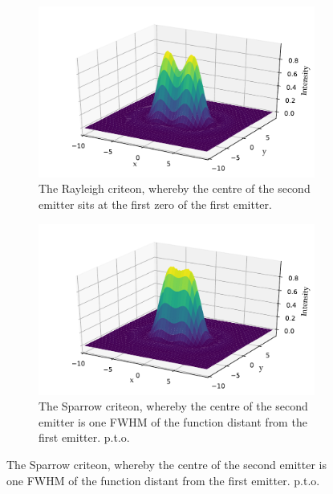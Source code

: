 \begin{figure}
    \centering
    \begin{subfigure}[b]{\textwidth}
        \centering
        \includegraphics{+airy_rayleigh}
        \caption{The Rayleigh criteon, whereby the centre of the second emitter sits at the first zero of the first emitter.}\label{fig:airy_rayleigh}
    \end{subfigure}
    \begin{subfigure}[b]{\textwidth}
        \includegraphics{+airy_sparrow}
        \caption{The Sparrow criteon, whereby the centre of the second emitter is one \gls{FWHM} of the function distant from the first emitter. p.t.o.}\label{fig:airy_sparrow}
    \end{subfigure}
    \end{figure}
